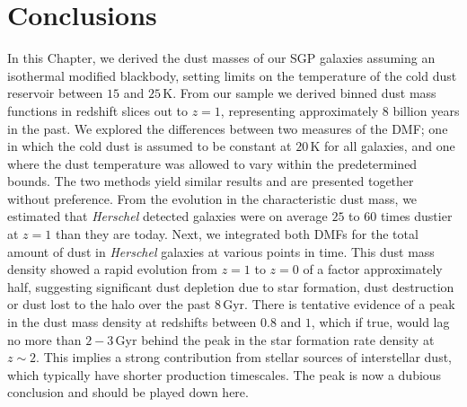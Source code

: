 \section{Conclusions}

In this Chapter, we derived the dust masses of our SGP galaxies assuming an isothermal modified blackbody, setting limits on the temperature of the cold dust reservoir between $15$ and $25\,$K. From our sample we derived binned dust mass functions in redshift slices out to $z = 1$, representing approximately $8$ billion years in the past. We explored the differences between two measures of the DMF; one in which the cold dust is assumed to be constant at $20\,$K for all galaxies, and one where the dust temperature was allowed to vary within the predetermined bounds. The two methods yield similar results and are presented together without preference. From the evolution in the characteristic dust mass, we estimated that \textit{Herschel} detected galaxies were on average $25$ to $60$ times dustier at $z = 1$ than they are today. Next, we integrated both DMFs for the total amount of dust in \textit{Herschel} galaxies at various points in time. This dust mass density showed a rapid evolution from $z = 1$ to $z = 0$ of a factor approximately half, suggesting significant dust depletion due to star formation, dust destruction or dust lost to the halo over the past $8\,$Gyr. There is tentative evidence of a peak in the dust mass density at redshifts between $0.8$ and $1$, which if true, would lag no more than $2 - 3\,$Gyr behind the peak in the star formation rate density at $z \sim 2$. This implies a strong contribution from stellar sources of interstellar dust, which typically have shorter production timescales. {\color{red}The peak is now a dubious conclusion and should be played down here.}

